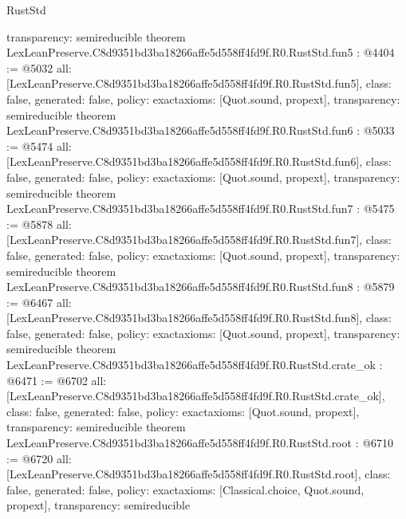 \begin{lexlean}{RustStd}
\begin{coremodule}
{  transparency: semireducible
}
theorem LexLeanPreserve.C8d9351bd3ba18266affe5d558ff4fd9f.R0.RustStd.fun5 : @4404 := @5032 {
  all: [LexLeanPreserve.C8d9351bd3ba18266affe5d558ff4fd9f.R0.RustStd.fun5],
  class: false,
  generated: false,
  policy: exact{axioms: [Quot.sound, propext]},
  transparency: semireducible
}
theorem LexLeanPreserve.C8d9351bd3ba18266affe5d558ff4fd9f.R0.RustStd.fun6 : @5033 := @5474 {
  all: [LexLeanPreserve.C8d9351bd3ba18266affe5d558ff4fd9f.R0.RustStd.fun6],
  class: false,
  generated: false,
  policy: exact{axioms: [Quot.sound, propext]},
  transparency: semireducible
}
theorem LexLeanPreserve.C8d9351bd3ba18266affe5d558ff4fd9f.R0.RustStd.fun7 : @5475 := @5878 {
  all: [LexLeanPreserve.C8d9351bd3ba18266affe5d558ff4fd9f.R0.RustStd.fun7],
  class: false,
  generated: false,
  policy: exact{axioms: [Quot.sound, propext]},
  transparency: semireducible
}
theorem LexLeanPreserve.C8d9351bd3ba18266affe5d558ff4fd9f.R0.RustStd.fun8 : @5879 := @6467 {
  all: [LexLeanPreserve.C8d9351bd3ba18266affe5d558ff4fd9f.R0.RustStd.fun8],
  class: false,
  generated: false,
  policy: exact{axioms: [Quot.sound, propext]},
  transparency: semireducible
}
theorem LexLeanPreserve.C8d9351bd3ba18266affe5d558ff4fd9f.R0.RustStd.crate_ok : @6471 := @6702 {
  all: [LexLeanPreserve.C8d9351bd3ba18266affe5d558ff4fd9f.R0.RustStd.crate_ok],
  class: false,
  generated: false,
  policy: exact{axioms: [Quot.sound, propext]},
  transparency: semireducible
}
theorem LexLeanPreserve.C8d9351bd3ba18266affe5d558ff4fd9f.R0.RustStd.root : @6710 := @6720 {
  all: [LexLeanPreserve.C8d9351bd3ba18266affe5d558ff4fd9f.R0.RustStd.root],
  class: false,
  generated: false,
  policy: exact{axioms: [Classical.choice, Quot.sound, propext]},
  transparency: semireducible
}


\end{coremodule}
\end{lexlean}
